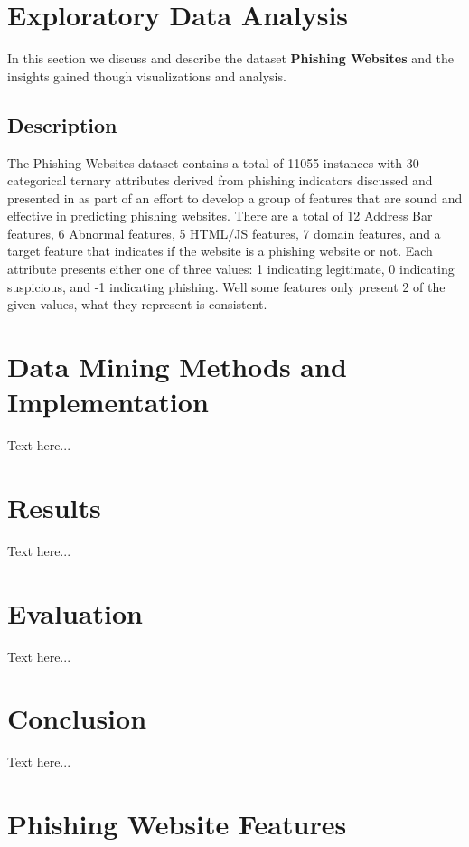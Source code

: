 \documentclass{sigkddExp}
\begin{document}
\section{Exploratory Data Analysis}
\label{eda}
In this section we discuss and describe the dataset \textbf{Phishing Websites} and the insights gained though visualizations and analysis.
\subsection{Description}
\label{descprition}
The Phishing Websites dataset contains a total of 11055 instances with 30 categorical ternary attributes derived from phishing indicators discussed and presented in \cite{6470857} as part of an effort to develop a group of features that are sound and effective in predicting phishing websites. There are a total of 12 Address Bar features, 6 Abnormal features, 5 HTML/JS features, 7 domain features, and a target feature that indicates if the website is a phishing website or not. Each attribute presents either one of three values: 1 indicating legitimate, 0 indicating suspicious, and -1 indicating phishing. Well some features only present 2 of the given values, what they represent is consistent.


 
\section{Data Mining Methods and Implementation}
Text here...

\section{Results}
Text here...

\section{Evaluation}
Text here...

\section{Conclusion}
Text here...

%


\appendix
\section{Phishing Website Features}
\end{document}

